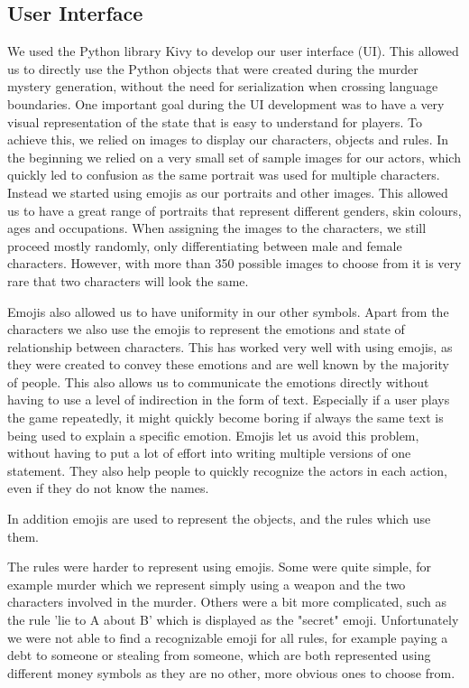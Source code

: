 \subsection{User Interface} \label{user_interface}

We used the Python library Kivy to develop our user interface (UI).
This allowed us to directly use the Python objects that were created during the murder mystery generation, without the need for serialization when crossing language boundaries.
One important goal during the UI development was to have a very visual representation of the state that is easy to understand for players.
To achieve this, we relied on images to display our characters, objects and rules.
In the beginning we relied on a very small set of sample images for our actors, which quickly led to confusion as the same portrait was used for multiple characters.
Instead we started using emojis as our portraits and other images.
This allowed us to have a great range of portraits that represent different genders, skin colours, ages and occupations.
When assigning the images to the characters, we still proceed mostly randomly, only differentiating between male and female characters.
However, with more than 350 possible images to choose from it is very rare that two characters will look the same.

Emojis also allowed us to have uniformity in our other symbols.
Apart from the characters we also use the emojis to represent the emotions and state of relationship between characters.
This has worked very well with using emojis, as they were created to convey these emotions and are well known by the majority of people.
This also allows us to communicate the emotions directly without having to use a level of indirection in the form of text.
Especially if a user plays the game repeatedly, it might quickly become boring if always the same text is being used to explain a specific emotion.
Emojis let us avoid this problem, without having to put a lot of effort into writing multiple versions of one statement.
They also help people to quickly recognize the actors in each action, even if they do not know the names.

In addition emojis are used to represent the objects, and the rules which use them.

The rules were harder to represent using emojis.
Some were quite simple, for example murder which we represent simply using a weapon and the two characters involved in the murder.
Others were a bit more complicated, such as the rule 'lie to A about B' which is displayed as the "secret" emoji.
Unfortunately we were not able to find a recognizable emoji for all rules, for example paying a debt to someone or stealing from someone, which are both represented using different money symbols as they are no other, more obvious ones to choose from.
